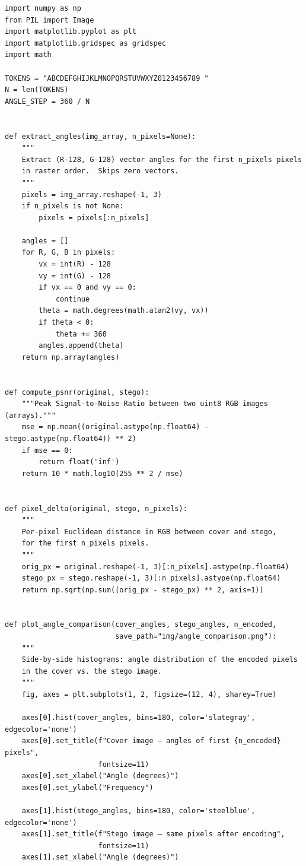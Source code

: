 \documentclass[12pt]{article}
\begin{document}
\begin{lstlisting}[caption={Comparative analysis of cover vs.\ stego image
(\texttt{analysis.py})}, label={lst:analysis}]
import numpy as np
from PIL import Image
import matplotlib.pyplot as plt
import matplotlib.gridspec as gridspec
import math

TOKENS = "ABCDEFGHIJKLMNOPQRSTUVWXYZ0123456789 "
N = len(TOKENS)
ANGLE_STEP = 360 / N


def extract_angles(img_array, n_pixels=None):
    """
    Extract (R-128, G-128) vector angles for the first n_pixels pixels
    in raster order.  Skips zero vectors.
    """
    pixels = img_array.reshape(-1, 3)
    if n_pixels is not None:
        pixels = pixels[:n_pixels]

    angles = []
    for R, G, B in pixels:
        vx = int(R) - 128
        vy = int(G) - 128
        if vx == 0 and vy == 0:
            continue
        theta = math.degrees(math.atan2(vy, vx))
        if theta < 0:
            theta += 360
        angles.append(theta)
    return np.array(angles)


def compute_psnr(original, stego):
    """Peak Signal-to-Noise Ratio between two uint8 RGB images (arrays)."""
    mse = np.mean((original.astype(np.float64) - stego.astype(np.float64)) ** 2)
    if mse == 0:
        return float('inf')
    return 10 * math.log10(255 ** 2 / mse)


def pixel_delta(original, stego, n_pixels):
    """
    Per-pixel Euclidean distance in RGB between cover and stego,
    for the first n_pixels pixels.
    """
    orig_px = original.reshape(-1, 3)[:n_pixels].astype(np.float64)
    stego_px = stego.reshape(-1, 3)[:n_pixels].astype(np.float64)
    return np.sqrt(np.sum((orig_px - stego_px) ** 2, axis=1))


def plot_angle_comparison(cover_angles, stego_angles, n_encoded,
                          save_path="img/angle_comparison.png"):
    """
    Side-by-side histograms: angle distribution of the encoded pixels
    in the cover vs. the stego image.
    """
    fig, axes = plt.subplots(1, 2, figsize=(12, 4), sharey=True)

    axes[0].hist(cover_angles, bins=180, color='slategray', edgecolor='none')
    axes[0].set_title(f"Cover image — angles of first {n_encoded} pixels",
                      fontsize=11)
    axes[0].set_xlabel("Angle (degrees)")
    axes[0].set_ylabel("Frequency")

    axes[1].hist(stego_angles, bins=180, color='steelblue', edgecolor='none')
    axes[1].set_title(f"Stego image — same pixels after encoding",
                      fontsize=11)
    axes[1].set_xlabel("Angle (degrees)")


\end{lstlisting}
\end{document}
